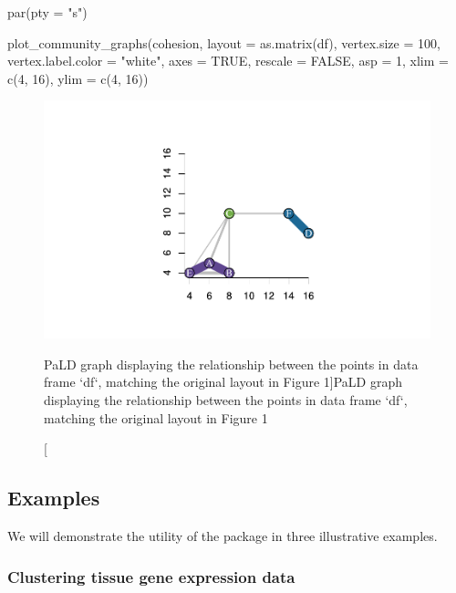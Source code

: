 \begin{Schunk}
\begin{Sinput}
par(pty = "s")

plot_community_graphs(cohesion, 
                      layout = as.matrix(df),
                      vertex.size = 100,
                      vertex.label.color = "white",
                      axes = TRUE,
                      rescale = FALSE,
                      asp = 1,
                      xlim = c(4, 16),
                      ylim = c(4, 16))
\end{Sinput}
\begin{figure}
\includegraphics{dagostino-mcgowan_files/figure-latex/fig3-1} \caption[PaLD graph displaying the relationship between the points in data frame `df`, matching the original layout in Figure 1]{PaLD graph displaying the relationship between the points in data frame `df`, matching the original layout in Figure 1}\label{fig:fig3}
\end{figure}
\end{Schunk}

\hypertarget{examples}{%
\subsection{Examples}\label{examples}}

We will demonstrate the utility of the  package in three
illustrative examples.

\hypertarget{clustering-tissue-gene-expression-data}{%
\subsubsection{Clustering tissue gene expression
data}\label{clustering-tissue-gene-expression-data}}


